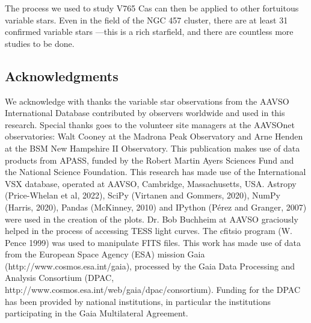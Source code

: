 \documentclass[linenumbers]{aastex631}
\begin{document}
The process we used to study V765 Cas can then be applied to other fortuitous variable stars. Even in the field of the NGC 457 cluster, there are at least 31 confirmed variable stars \citep{MACIEJEWSKI}—this is a rich starfield, and there are countless more studies to be done.


\begin{acknowledgments}
\section{Acknowledgments}
We acknowledge with thanks the variable star observations from the AAVSO International Database contributed by observers worldwide and used in this research.
\newline \newline
Special thanks goes to the volunteer site managers at the AAVSOnet observatories: Walt Cooney at the Madrona Peak Observatory and Arne Henden at the BSM New Hampshire II Observatory.
\newline \newline
This publication makes use of data products from APASS, funded by the Robert Martin Ayers Sciences Fund and the National Science Foundation.
\newline \newline
This research has made use of the International VSX database, operated at AAVSO, Cambridge, Massachusetts, USA.
\newline \newline
Astropy (Price-Whelan et al, 2022), SciPy (Virtanen and Gommers, 2020), NumPy (Harris, 2020), Pandas (McKinney, 2010) and IPython (Pérez and Granger, 2007) were used in the creation of the plots.
\newline \newline
Dr. Bob Buchheim at AAVSO graciously helped in the process of accessing TESS light curves.
\newline \newline
The cfitsio program (W. Pence 1999) was used to manipulate FITS files.
\newline \newline
This work has made use of data from the European Space Agency (ESA) mission Gaia (http://www.cosmos.esa.int/gaia), processed by the Gaia Data Processing and Analysis Consortium (DPAC, http://www.cosmos.esa.int/web/gaia/dpac/consortium). Funding for the DPAC has been provided by national institutions, in particular the institutions participating in the Gaia Multilateral Agreement.
\newline \newline

\end{acknowledgments}
\end{document}

